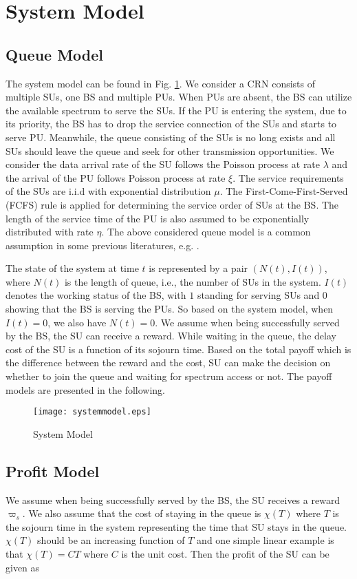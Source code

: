 \documentclass[journal]{IEEEtran}
\begin{document}
\section{System Model}
\label{Sec2}

\subsection{Queue Model}
The system model can be found in Fig. \ref{fig:1}. We consider a
CRN consists of multiple SUs, one BS and multiple PUs. When PUs are
absent, the BS can utilize the available spectrum to serve the SUs. If
the PU is entering the system, due to its priority, the BS has to drop the
service connection of the SUs and starts to serve PU. Meanwhile, the
queue consisting of the SUs is no long exists and all SUs should leave the queue
and seek for other transmission opportunities. We consider the
data arrival rate of the SU follows the Poisson process at rate $\lambda$
and the arrival of the PU follows Poisson process at rate $\xi$. The
service requirements of the SUs are i.i.d with exponential distribution
$\mu$. The First-Come-First-Served (FCFS) rule is applied for
determining the service order of SUs at the BS. The length of the service
time of the PU is also assumed to be exponentially distributed with
rate $\eta$. The above considered queue model is a common assumption in
some previous literatures, e.g. \cite{HLi} \cite{Do1}. \par

The state of the system at time $t$ is represented by a pair
$(N(t), I(t))$, where $N(t)$ is the length of queue, i.e., the
number of SUs in the system. $I(t)$ denotes the working status of
the BS, with $1$ standing for serving SUs and $0$ showing that the BS
is serving the PUs. So based on the system model, when $I(t) = 0$, we
also have $N(t)=0$. We assume when being successfully served by the BS, the SU can receive a
reward. While waiting in the queue, the delay cost of the SU is a function of its sojourn time. Based on
the total payoff which is the difference between the reward and the cost, SU can make the decision on
whether to join the queue and waiting for spectrum access or not. The payoff models are presented in the following.

\begin{figure}[t]
\centering
\texttt{[image: systemmodel.eps]}
\caption{System Model} \label{fig:1}
\end{figure}

\subsection{Profit Model}
We assume when being successfully served by the BS, the SU receives a
reward $\varpi_s$. We also assume that the cost of staying in the
queue is $\chi(T)$ where $T$ is the sojourn time in the system
representing the time that SU stays in the queue. $\chi(T)$ should be an
increasing function of $T$ and one simple linear example is that
$\chi(T) = C T$ where $C$ is the unit cost. Then the profit of the
SU can be given as
\end{document}
